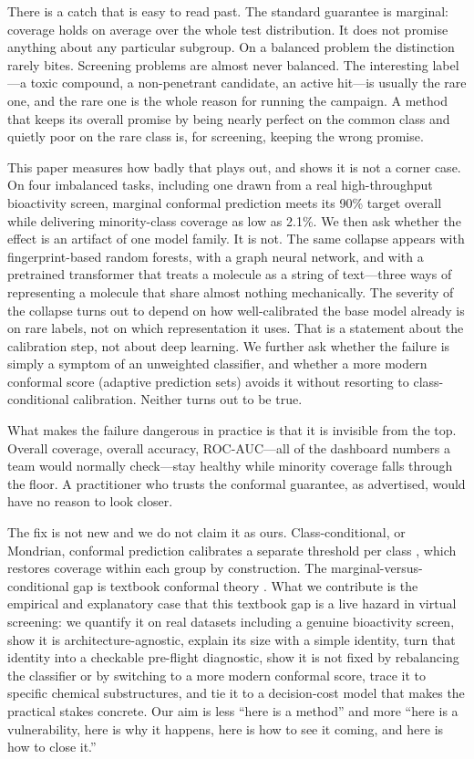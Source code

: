 \documentclass[11pt]{article}
\begin{document}
There is a catch that is easy to read past. The standard guarantee is marginal: coverage holds on
average over the whole test distribution. It does not promise anything about any particular
subgroup. On a balanced problem the distinction rarely bites. Screening problems are almost never
balanced. The interesting label---a toxic compound, a non-penetrant candidate, an active
hit---is usually the rare one, and the rare one is the whole reason for running the campaign. A
method that keeps its overall promise by being nearly perfect on the common class and quietly poor
on the rare class is, for screening, keeping the wrong promise.

This paper measures how badly that plays out, and shows it is not a corner case. On four imbalanced
tasks, including one drawn from a real high-throughput bioactivity screen, marginal conformal
prediction meets its 90\% target overall while delivering minority-class coverage as low as 2.1\%.
We then ask whether the effect is an artifact of one model family. It is not. The same collapse
appears with fingerprint-based random forests, with a graph neural network, and with a pretrained
transformer that treats a molecule as a string of text---three ways of representing a molecule that
share almost nothing mechanically. The severity of the collapse turns out to depend on how
well-calibrated the base model already is on rare labels, not on which representation it uses. That
is a statement about the calibration step, not about deep learning. We further ask whether the
failure is simply a symptom of an unweighted classifier, and whether a more modern conformal score
(adaptive prediction sets) avoids it without resorting to class-conditional calibration. Neither
turns out to be true.

What makes the failure dangerous in practice is that it is invisible from the top. Overall
coverage, overall accuracy, ROC-AUC---all of the dashboard numbers a team would normally
check---stay healthy while minority coverage falls through the floor. A practitioner who trusts
the conformal guarantee, as advertised, would have no reason to look closer.

The fix is not new and we do not claim it as ours. Class-conditional, or Mondrian, conformal
prediction calibrates a separate threshold per class \cite{vovk2013}, which restores coverage
within each group by construction. The marginal-versus-conditional gap is textbook conformal
theory \cite{angelopoulos2023}. What we contribute is the empirical and explanatory case that this
textbook gap is a live hazard in virtual screening: we quantify it on real datasets including a
genuine bioactivity screen, show it is architecture-agnostic, explain its size with a simple
identity, turn that identity into a checkable pre-flight diagnostic, show it is not fixed by
rebalancing the classifier or by switching to a more modern conformal score, trace it to specific
chemical substructures, and tie it to a decision-cost model that makes the practical stakes
concrete. Our aim is less ``here is a method'' and more ``here is a vulnerability, here is why it
happens, here is how to see it coming, and here is how to close it.''
\end{document}
